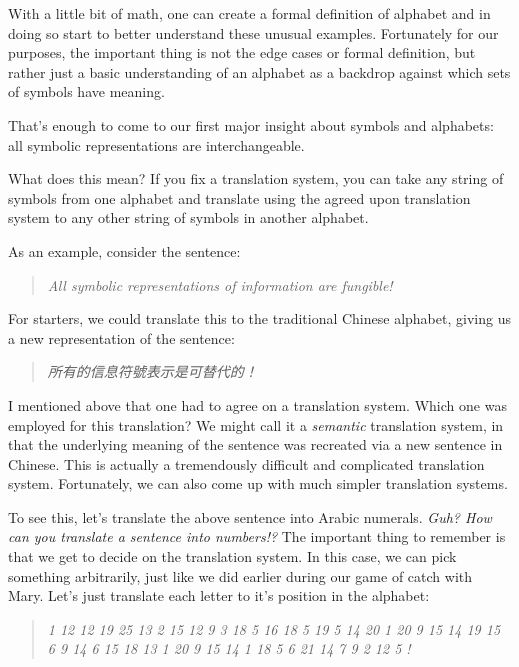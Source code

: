 \documentclass[UTF8]{book}
\begin{document}
\begin{CJK}{UTF8}{gbsn}
With a little bit of math, one can create a formal definition of alphabet and in doing so start to better understand these unusual examples. Fortunately for our purposes, the important thing is not the edge cases or formal definition, but rather just a basic understanding of an alphabet as a backdrop against which sets of symbols have meaning.

That's enough to come to our first major insight about symbols and alphabets: all symbolic representations are interchangeable.

What does this mean? If you fix a translation system, you can take any string of symbols from one alphabet and translate using the agreed upon translation system to any other string of symbols in another alphabet.

As an example, consider the sentence:

\begin{quotation}
\centering
\emph{All symbolic representations of information are fungible!}
\end{quotation}

For starters, we could translate this to the traditional Chinese alphabet, giving us a new representation of the sentence:

\begin{quotation}
\centering
\emph{所有的信息符號表示是可替代的！}
\end{quotation}

I mentioned above that one had to agree on a translation system.  Which one was employed for this translation? We might call it a \emph{semantic} translation system, in that the underlying meaning of the sentence was recreated via a new sentence in Chinese. This is actually a tremendously difficult and complicated translation system. Fortunately, we can also come up with much simpler translation systems.

To see this, let's translate the above sentence into Arabic numerals. \emph{Guh? How can you translate a sentence into numbers!?} The important thing to remember is that we get to decide on the translation system. In this case, we can pick something arbitrarily, just like we did earlier during our game of catch with Mary. Let's just translate each letter to it's position in the alphabet:

\begin{quotation}
\centering
\emph{1 12 12  19 25 13 2 15 12 9 3  18 5 16 18 5 19 5 14 20 1 20 9 15 14 19  15 6  9 14 6 15 18 13 1 20 9 15 14  1 18 5  6 21 14 7 9 2 12 5 !}
\end{quotation}


\end{CJK}
\end{document}
